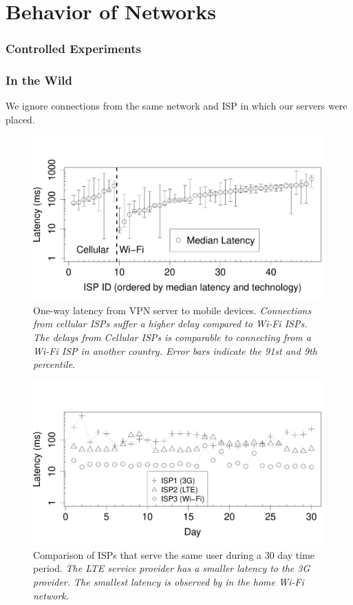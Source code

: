\section{Behavior of Networks}

\subsubsection{Controlled Experiments}

\subsubsection{In the Wild}

We ignore connections from the same network and ISP in which our servers were placed.
 
\begin{figure}[t]
\includegraphics[width=\columnwidth]{plots/latency_isp_whisker.pdf}
\caption{One-way latency from VPN server to mobile devices. \emph{Connections from cellular ISPs suffer a higher delay compared to Wi-Fi ISPs. The delays from Cellular ISPs is comparable to connecting from a Wi-Fi ISP in another country. Error bars indicate the 91st and 9th percentile}.}
\label{fig:latency-across-isps}
\end{figure}


\begin{figure}[t]
\includegraphics[width=\columnwidth]{plots/compare_isp_latency.pdf}
\caption{Comparison of ISPs that serve the same user during a 30 day time period. \emph{The LTE service provider has a smaller latency to the 3G provider. The smallest latency is observed by in the home Wi-Fi network.}}
\label{fig:compare-isp-latency}
\end{figure}


